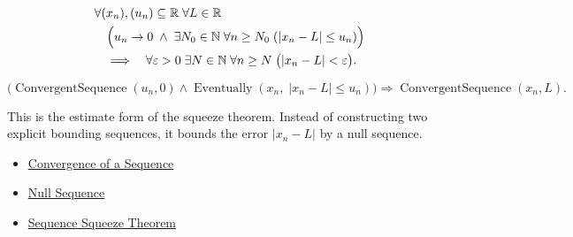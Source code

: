 \begin{remark*}
\[
\begin{aligned}
&\forall (x_n),(u_n)\subseteq\mathbb{R}\;\forall L\in\mathbb{R}\\
&\quad\Bigl(
  u_n\to 0
  \;\land\;
  \exists N_0\in\mathbb{N}\;\forall n\ge N_0\;(|x_n-L|\le u_n)
\Bigr)\\
&\quad\Longrightarrow\quad
\forall \varepsilon>0\;\exists N\in\mathbb{N}\;\forall n\ge N\;
\bigl(|x_n-L|<\varepsilon\bigr).
\end{aligned}
\]
\end{remark*}

\begin{remark*}
\[
\bigl(
\operatorname{ConvergentSequence}(u_n,0)
\land
\operatorname{Eventually}(x_n,\;|x_n-L|\le u_n)
\bigr)
\Longrightarrow
\operatorname{ConvergentSequence}(x_n,L).
\]
\end{remark*}

\begin{remark*}[Interpretation]
This is the estimate form of the squeeze theorem. Instead of constructing
two explicit bounding sequences, it bounds the error $|x_n-L|$ by a null
sequence.
\end{remark*}

\begin{dependencies}
\begin{itemize}
  \item \hyperref[def:convergent-sequence]{Convergence of a Sequence}
  \item \hyperref[def:null-sequence]{Null Sequence}
  \item \hyperref[thm:sequence-squeeze-theorem]{Sequence Squeeze Theorem}
\end{itemize}
\end{dependencies}



